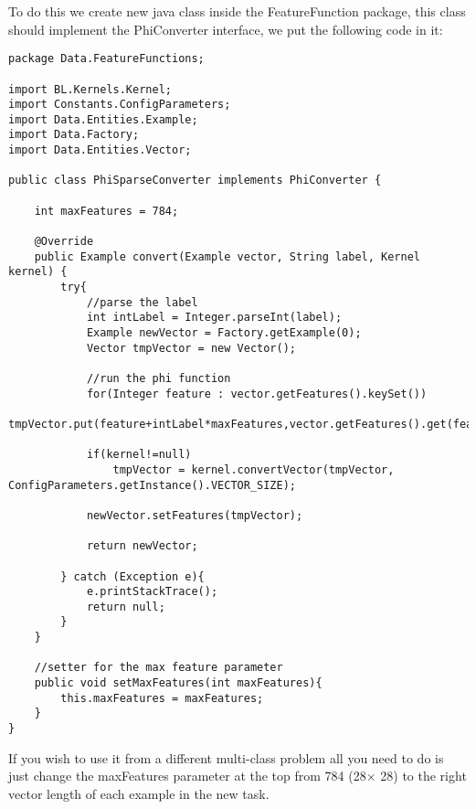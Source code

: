 \documentclass[11pt, oneside]{article}   	%
\begin{document}
To do this we create new java class inside the FeatureFunction package, this class should implement the PhiConverter interface, we put the following code in it:
\begin{lstlisting}
package Data.FeatureFunctions;

import BL.Kernels.Kernel;
import Constants.ConfigParameters;
import Data.Entities.Example;
import Data.Factory;
import Data.Entities.Vector;

public class PhiSparseConverter implements PhiConverter {

    int maxFeatures = 784;

	@Override
	public Example convert(Example vector, String label, Kernel kernel) {
        try{
            //parse the label
            int intLabel = Integer.parseInt(label);
            Example newVector = Factory.getExample(0);
            Vector tmpVector = new Vector();

            //run the phi function
            for(Integer feature : vector.getFeatures().keySet())
                tmpVector.put(feature+intLabel*maxFeatures,vector.getFeatures().get(feature));

            if(kernel!=null)
                tmpVector = kernel.convertVector(tmpVector, ConfigParameters.getInstance().VECTOR_SIZE);

            newVector.setFeatures(tmpVector);

            return newVector;

        } catch (Exception e){
            e.printStackTrace();
            return null;
        }
	}

    //setter for the max feature parameter
    public void setMaxFeatures(int maxFeatures){
        this.maxFeatures = maxFeatures;
    }
}
\end{lstlisting}

If you wish to use it from a different multi-class problem all you need to do is just change the maxFeatures parameter at the top from 784 (28$\times$ 28) to the right vector length of each example in the new task.
\end{document}
